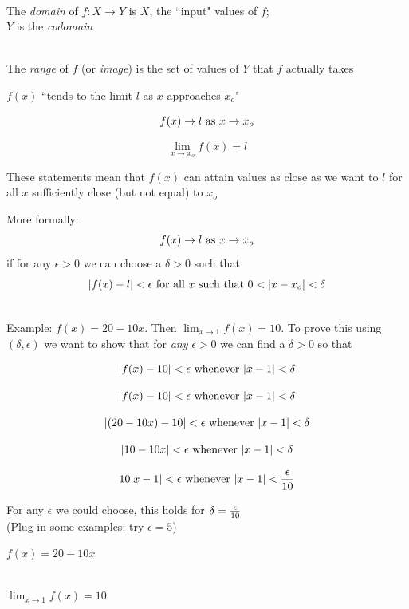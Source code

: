 \documentclass[10pt]{seminar}
\begin{document}
\begin{slide}
\ \\The \textit{domain} of $f:X\rightarrow Y$ is $X$, the ``input" values of $f$; \\$Y$ is the \textit{codomain}  

\ \\The \textit{range} of $f$ (or \textit{image}) is the set of values of $Y$ that $f$ actually takes


\newslide

\begin{center}$f(x)$ ``tends to the limit $l$ as $x$ approaches $x_o$" \end{center}

 $$f(x)\rightarrow l \hbox{ as }x\rightarrow x_o$$
 
 $$\lim_{x\rightarrow x_o}f(x)=l$$

These statements mean that $f(x)$ can attain values as close as we want to $l$ for all $x$ sufficiently close (but not equal) to $x_o$

\newslide

More formally:  $$f(x)\rightarrow l \hbox{ as }x\rightarrow x_o$$ if for any $\epsilon>0$ we can choose a $\delta>0$ such that $$|f(x)-l|<\epsilon \hbox{ for all }x \hbox{ such that }0<|x-x_o|<\delta$$

\ \\Example: $f(x)=20-10x$.  Then $\lim_{x\rightarrow 1} f(x)=10$.  To prove this using $(\delta, \epsilon)$ we want to show that for \textit{any} $\epsilon>0$ we can find a $\delta>0$  so that

$$|f(x)-10|<\epsilon \hbox{ whenever }|x-1|<\delta$$

\newslide

$$|f(x)-10|<\epsilon \hbox{ whenever }|x-1|<\delta$$

$$|(20-10x)-10|<\epsilon \hbox{ whenever } |x-1|<\delta $$

$$|10-10x|<\epsilon \hbox{ whenever } |x-1|<\delta $$

$$10 |x-1|<\epsilon \hbox{ whenever } |x-1|<{\epsilon\over 10 }$$

For any $\epsilon$ we could choose, this holds for $\delta={\epsilon\over 10}$ \\(Plug in some examples: try $\epsilon=5$)

\newslide
$f(x)=20-10x$

\ \\ $\lim_{x\rightarrow 1} f(x)=10$

\vspace{.1in}
\begin{center}
\end{center}


\end{slide}
\end{document}
